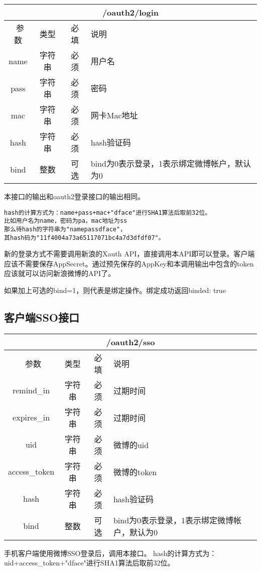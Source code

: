 \begin{table}[H]
   \begin{center}
\begin{tabular}{|c|c|c|p{12cm}|}
\hline
\multicolumn{4}{|c|}{/oauth2/login} \\
\hline\hline
 \  参数  & 类型 & 必填 &  说明  \\
\hline
 name  & 字符串 & 必须 &  用户名\\
 \hline
 pass  & 字符串 & 必须 &  密码\\
  \hline
 mac  & 字符串 & 必须 &  网卡Mac地址\\
 \hline
 hash  & 字符串 & 必须 &  hash验证码\\
\hline
 bind  & 整数 & 可选 &  bind为0表示登录，1表示绑定微博帐户，默认为0\\
\hline
\end{tabular}
   \end{center}
\end{table}

本接口的输出和oauth2登录接口的输出相同。

\begin{verbatim}
hash的计算方式为：name+pass+mac+"dface"进行SHA1算法后取前32位。
比如用户名为name，密码为pa，mac地址为ss
那么待hash的字符串为"namepassdface"，
其hash码为"11f4004a73a65117071bc4a7d3dfdf07"。
\end{verbatim}

新的登录方式不需要调用新浪的Xauth API，直接调用本API即可以登录。客户端应该不需要保存AppSecret。通过预先保存的AppKey和本调用输出中包含的token应该就可以访问新浪微博的API了。

如果加上可选的bind=1，则代表是绑定操作。绑定成功返回{binded: true}



\subsection{客户端SSO接口}
\label{hash_algorithm}

\begin{table}[H]
   \begin{center}
\begin{tabular}{|c|c|c|p{12cm}|}
\hline
\multicolumn{4}{|c|}{/oauth2/sso} \\
\hline\hline
 \  参数  & 类型 & 必填 &  说明  \\
\hline
 remind\_in  & 字符串 & 必须 &  过期时间\\
 \hline
 expires\_in  & 字符串 & 必须 &  过期时间\\
  \hline
 uid  & 字符串 & 必须 &  微博的uid\\
  \hline
 access\_token  & 字符串 & 必须 &  微博的token\\
 \hline
 hash  & 字符串 & 必须 &  hash验证码\\
\hline
 bind  & 整数 & 可选 &  bind为0表示登录，1表示绑定微博帐户，默认为0\\
\hline
\end{tabular}
   \end{center}
\end{table}
手机客户端使用微博SSO登录后，调用本接口。
hash的计算方式为：uid+access\_token+"dface"进行SHA1算法后取前32位。


